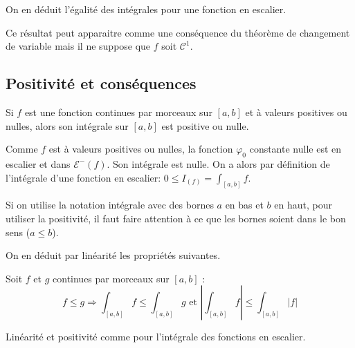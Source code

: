 On en déduit l'égalité des intégrales pour une fonction en escalier.
\begin{rem}
 Ce résultat peut apparaitre comme une conséquence du théorème de changement de variable mais il ne suppose que $f$ soit $\mathcal{C}^1$.  
\end{rem}

\subsection{Positivité et conséquences}
\begin{propn}
 Si $f$ est une fonction continues par morceaux sur $[a,b]$ et à valeurs positives ou nulles, alors son intégrale sur $[a,b]$ est positive ou nulle.
\end{propn}
\begin{demo}
 Comme $f$ est à valeurs positives ou nulles, la fonction $\varphi_0$ constante nulle est en escalier et dans $\mathcal{E}^-(f)$. Son intégrale est nulle. On a alors par définition de l'intégrale d'une fonction en escalier: $0\leq I_(f)=\int_{[a,b]}f$.
\end{demo}
\begin{rem}
 Si on utilise la notation intégrale avec des bornes $a$ en bas et $b$ en haut, pour utiliser la positivité, il faut faire attention à ce que les bornes soient dans le bon sens ($a\leq b$).
\end{rem}

On en déduit par linéarité les propriétés suivantes.
\begin{propn}
 Soit $f$ et $g$ continues par morceaux sur $[a,b]$ :
\begin{displaymath}
 f\leq g \Rightarrow \int_{[a,b]}f \leq \int_{[a,b]}g\text{ et } \left\vert\int_{[a,b]}f\right\vert\leq \int_{[a,b]}|f|
\end{displaymath}
\end{propn}
\begin{demo}
 Linéarité et positivité comme pour l'intégrale des fonctions en escalier.
\end{demo}

